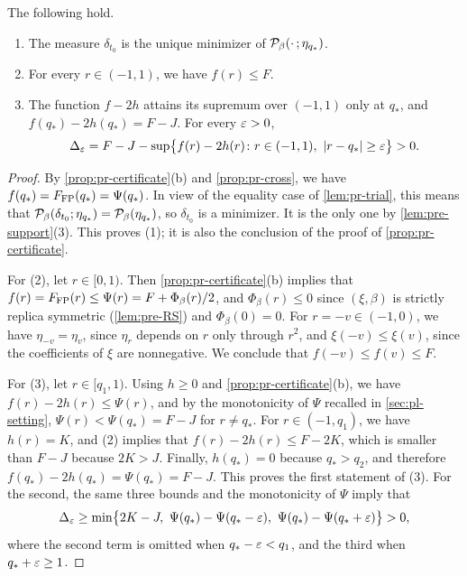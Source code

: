 \begin{lemma}\label{lem:pl-profile}
The following hold.
\begin{enumerate}
\item The measure $\delta_{t_0}$ is the unique minimizer of $\mathcal P_\beta(\cdot\,;\eta_{q_*})$.
\item For every $r\in(-1,1)$, we have $f(r)\le F$.
\item The function $f-2h$ attains its supremum over $(-1,1)$ only at $q_*$, and $f(q_*)-2h(q_*)=F-J$. For every $\varepsilon>0$,
\[
\Delta_\varepsilon=F-J-\sup\bigl\{f(r)-2h(r)\colon r\in(-1,1),\ \left|r-q_*\right|\ge\varepsilon\bigr\}>0 .
\]
\end{enumerate}
\end{lemma}

\begin{proof}
By \cref{prop:pr-certificate}(b) and \cref{prop:pr-cross}, we have $f(q_*)=F_{\rm FP}(q_*)=\Psi(q_*)$. In view of the equality case of \cref{lem:pr-trial}, this means that $\mathcal P_\beta(\delta_{t_0};\eta_{q_*})=\mathcal P_\beta(\eta_{q_*})$, so $\delta_{t_0}$ is a minimizer. It is the only one by \cref{lem:pre-support}(3). This proves (1); it is also the conclusion of the proof of \cref{prop:pr-certificate}.

For (2), let $r\in[0,1)$. Then \cref{prop:pr-certificate}(b) implies that $f(r)=F_{\rm FP}(r)\le\Psi(r)=F+\Phi_\beta(r)/2$, and $\Phi_\beta(r)\le0$ since $(\xi,\beta)$ is strictly replica symmetric (\cref{lem:pre-RS}) and $\Phi_\beta(0)=0$. For $r=-v\in(-1,0)$, we have $\eta_{-v}=\eta_v$, since $\eta_r$ depends on $r$ only through $r^2$, and $\xi(-v)\le\xi(v)$, since the coefficients of $\xi$ are nonnegative. We conclude that $f(-v)\le f(v)\le F$.

For (3), let $r\in[q_1,1)$. Using $h\ge0$ and \cref{prop:pr-certificate}(b), we have $f(r)-2h(r)\le\Psi(r)$, and by the monotonicity of $\Psi$ recalled in \cref{sec:pl-setting}, $\Psi(r)<\Psi(q_*)=F-J$ for $r\ne q_*$. For $r\in(-1,q_1)$, we have $h(r)=K$, and (2) implies that $f(r)-2h(r)\le F-2K$, which is smaller than $F-J$ because $2K>J$. Finally, $h(q_*)=0$ because $q_*>q_2$, and therefore $f(q_*)-2h(q_*)=\Psi(q_*)=F-J$. This proves the first statement of (3). For the second, the same three bounds and the monotonicity of $\Psi$ imply that
\[
\Delta_\eps\ge\min\bigl\{2K-J,\ \Psi(q_*)-\Psi(q_*-\eps),\ \Psi(q_*)-\Psi(q_*+\eps)\bigr\}>0,
\]
where the second term is omitted when $q_*-\varepsilon<q_1$, and the third when $q_*+\varepsilon\ge1$.
\end{proof}

